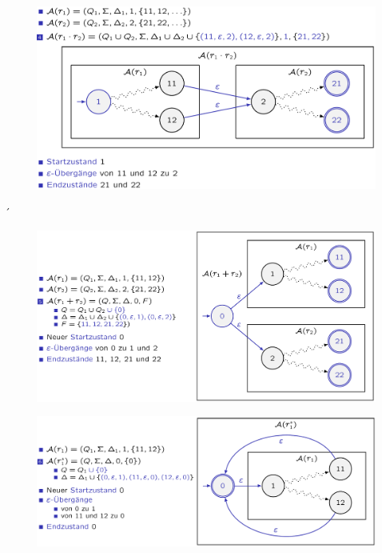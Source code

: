 \documentclass[12pt,a4paper]{article}
\begin{document}
	\begin{center}
		\begin{figure}[!h]
			\includegraphics[width=\textwidth]{Bilder/KonkatenationNEA.png}
		\end{figure}
	\end{center}´
	\begin{center}
		\begin{figure}[!h]
			\includegraphics[width=\textwidth]{Bilder/VereinigungNEA.png}
		\end{figure}
	\end{center}

	\begin{center}
		\begin{figure}[!h]
			\includegraphics[width=\textwidth]{Bilder/KleeneNEA.png}
		\end{figure}
	\end{center}
\end{document}

